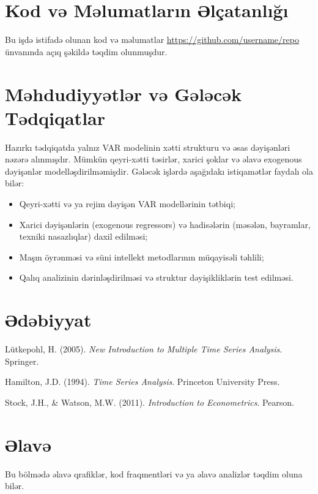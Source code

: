 \documentclass[12pt,a4paper]{article}
\begin{document}
\section*{Kod və Məlumatların Əlçatanlığı}
Bu işdə istifadə olunan kod və məlumatlar \url{https://github.com/username/repo} ünvanında açıq şəkildə təqdim olunmuşdur.

\section*{Məhdudiyyətlər və Gələcək Tədqiqatlar}
Hazırkı tədqiqatda yalnız VAR modelinin xətti strukturu və əsas dəyişənləri nəzərə alınmışdır. Mümkün qeyri-xətti təsirlər, xarici şoklar və əlavə exogenous dəyişənlər modelləşdirilməmişdir. Gələcək işlərdə aşağıdakı istiqamətlər faydalı ola bilər:
\begin{itemize}
    \item Qeyri-xətti və ya rejim dəyişən VAR modellərinin tətbiqi;
    \item Xarici dəyişənlərin (exogenous regressors) və hadisələrin (məsələn, bayramlar, texniki nasazlıqlar) daxil edilməsi;
    \item Maşın öyrənməsi və süni intellekt metodlarının müqayisəli təhlili;
    \item Qalıq analizinin dərinləşdirilməsi və struktur dəyişikliklərin test edilməsi.
\end{itemize}

\section*{Ədəbiyyat}
\begin{thebibliography}{9}

Lütkepohl, H. (2005).
\textit{New Introduction to Multiple Time Series Analysis}.
Springer.

Hamilton, J.D. (1994).
\textit{Time Series Analysis}.
Princeton University Press.

Stock, J.H., \& Watson, M.W. (2011).
\textit{Introduction to Econometrics}.
Pearson.

\end{thebibliography}

\section*{Əlavə}
Bu bölmədə əlavə qrafiklər, kod fraqmentləri və ya əlavə analizlər təqdim oluna bilər.
\end{document}
